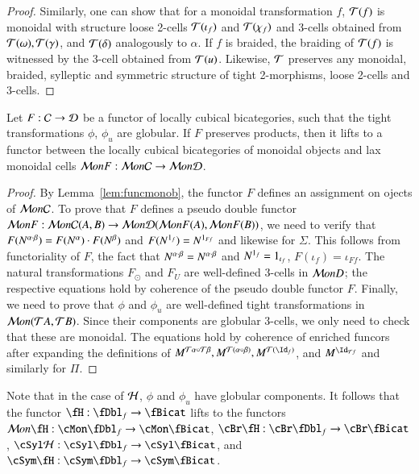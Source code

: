 \begin{proof}

Similarly, one can show that for a monoidal transformation $f$, $\mathcal{T}(f)$ is monoidal with structure loose 2-cells $\mathcal{T}(\iota_f)$ and $\mathcal{T}(\chi_f)$ and 3-cells obtained from $\mathcal{T}(\omega),  \mathcal{T}(\gamma)$, and $\mathcal{T}(\delta)$ analogously to $\alpha$. If $f$ is braided, the braiding of $\mathcal{T}(f)$ is witnessed by the 3-cell obtained from $\mathcal{T}(u)$. Likewise, $\mathcal{T}$ preserves any monoidal, braided, sylleptic and symmetric structure of tight 2-morphisms, loose 2-cells and 3-cells. 
 \end{proof}


\begin{thm}\label{thm:lcbcfunctor}
Let $F: \mathcal{C}  \rightarrow \mathcal{D}$ be a functor of locally cubical bicategories, such that the tight transformations $\phi$, $\phi_u$ are globular. If $F$ preserves products, then it lifts to a functor between the locally cubical bicategories of monoidal objects and lax monoidal cells $\mathcal{M} onF: \mathcal{M} on \mathcal{C}  \rightarrow \mathcal{M} on\mathcal{D}$.
\end{thm}

\begin{proof}
By Lemma~\ref{lem:funcmonob}, the functor $F$ defines an assignment on ojects of $\mathcal{M} on\mathcal{C}$. To prove that $F$ defines a pseudo double functor $\mathcal{M} onF: \mathcal{M} on \mathcal{C}(A, B)  \rightarrow \mathcal{M} on\mathcal{D}(\mathcal{M} onF(A), \mathcal{M} onF(B))$, we need to verify that $F(N^{\alpha \cdot \beta}) = F(N^{\alpha}) \cdot F(N^{\beta})$ and $F(N^{1_f}) = N^{1_{Ff}}$ and likewise for $\Sigma$. This follows from functoriality of $F$, the fact that $N^{\alpha \cdot \beta} = N^{\alpha \cdot \beta}$ and $N^{1_f} = 1_{\iota_f}$, $F(\iota_f) = \iota_{Ff}$.
The natural transformations $F_{\odot}$ and $F_U$ are well-defined 3-cells in $\mathcal{M} onD$; the respective equations hold by coherence of the pseudo double functor $F$.
Finally, we need to prove that $\phi$ and $\phi_u$ are well-defined tight transformations in $\mathcal{M} on(\mathcal{T} A, \mathcal{T} B)$. Since their components are globular 3-cells, we only need to check that these are monoidal. The equations hold by coherence of enriched funcors after expanding the definitions of $M^{\cT\alpha \comp \cT \beta}, M^{\cT(\alpha \comp \beta)}, M^{\cT(\looseid_f)}$, and $M^{\looseid_{\cT f}}$ and similarly for $\Pi$.
\end{proof}

Note that in the case of $\mathcal{H}$, $\phi$ and $\phi_u$ have globular components. It follows that the functor $\fH: \fDbl_f \rightarrow \fBicat$ lifts to the functors $\cM on \fH: \cMon\fDbl_f \rightarrow \cMon \fBicat$, $\cBr \fH: \cBr\fDbl_f \rightarrow \cBr \fBicat$,  $\cSyl\cH: \cSyl\fDbl_f \rightarrow \cSyl\fBicat$, and $\cSym \fH: \cSym\fDbl_f \rightarrow \cSym \fBicat$.
